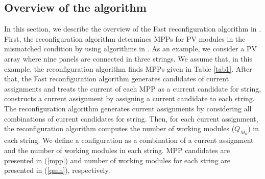 \documentclass[conference]{IEEEtran}
\begin{document}
\subsection{Overview of the algorithm}
In this section, we describe the overview of the Fast reconfiguration algorithm in \cite{b10}. First, the reconfiguration algorithm determines MPPs for PV modules in the mismatched condition by using algorithms in \cite{b6}\cite{b7}. As an example, we consider a PV array where nine panels are connected in three strings. We assume that, in this example, the reconfiguration algorithm finds MPPs given in Table \ref{tab1}.
After that, the Fast reconfiguration algorithm generates candidates of current assignments 
and treats the current of each MPP as a current candidate for string, constructs a current assignment by assigning a current candidate to each string. The reconfiguration algorithm generates current assignments by considering all combinations of current candidates for string.
Then, for each current assignment, the reconfiguration algorithm computes the number of working modules (\textit{$Q_{M_n}$}) in each string. We define a configuration as a combination of a current assignment and the number of working modules in each string. MPP candidates are presented in (\ref{mpp}) and number of working modules for each string are presented in (\ref{qmn}), respectively. 
\end{document}
